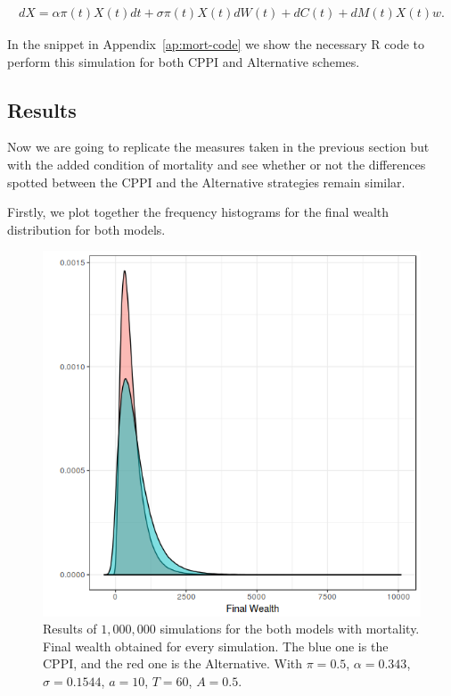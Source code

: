 \begin{align}
	dX = \alpha \pi(t)X(t)dt + \sigma \pi(t)X(t)dW(t) + dC(t) + dM(t)X(t)w \textit{.}
\end{align}

In the snippet in Appendix~\ref{ap:mort-code} we show the necessary R code to perform this simulation for both CPPI and Alternative schemes.

\subsection{Results}

Now we are going to replicate the measures taken in the previous section but with the added condition of mortality and see whether or not the differences spotted between the CPPI and the Alternative strategies remain similar.

Firstly, we plot together the frequency histograms for the final wealth distribution for
both models.

\begin{figure}[h]
    \centering
    \includegraphics[scale=0.75]{./images/mort_final_wealth.png}
    \caption{Results of $1,000,000$ simulations for the both models with mortality. Final wealth obtained for every simulation. The blue one is the CPPI, and the red one is the Alternative. With $\pi = 0.5$, $\alpha = 0.343$, $\sigma = 0.1544$, $a = 10$, $T = 60$, $A = 0.5$.}
    \label{fig:mort_fw}
\end{figure}


